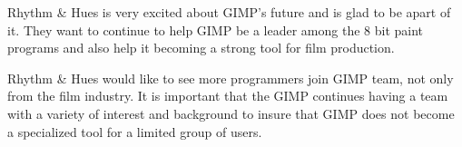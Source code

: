 
Rhythm \& Hues is very excited about GIMP's future and is glad to be apart of it. They want to continue to help GIMP be a leader among the 8 bit paint programs and also help it becoming a strong tool for film production. 

Rhythm \& Hues would like to see more programmers join GIMP team, not only from the film industry. It is important that the GIMP continues having a team with a variety of interest and background to insure that GIMP does not become a specialized tool for a limited group of users.


